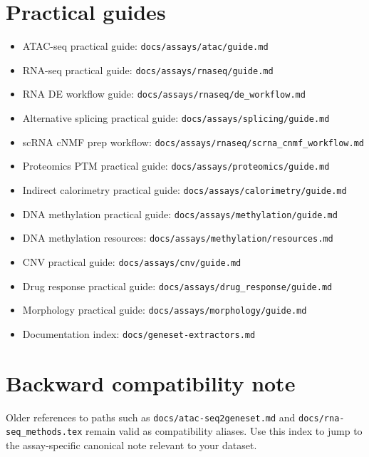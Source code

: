 \documentclass[11pt]{article}
\begin{document}
\section*{Practical guides}
\begin{itemize}[leftmargin=2em]
\item ATAC-seq practical guide: \texttt{docs/assays/atac/guide.md}
\item RNA-seq practical guide: \texttt{docs/assays/rnaseq/guide.md}
\item RNA DE workflow guide: \texttt{docs/assays/rnaseq/de\_workflow.md}
\item Alternative splicing practical guide: \texttt{docs/assays/splicing/guide.md}
\item scRNA cNMF prep workflow: \texttt{docs/assays/rnaseq/scrna\_cnmf\_workflow.md}
\item Proteomics PTM practical guide: \texttt{docs/assays/proteomics/guide.md}
\item Indirect calorimetry practical guide: \texttt{docs/assays/calorimetry/guide.md}
\item DNA methylation practical guide: \texttt{docs/assays/methylation/guide.md}
\item DNA methylation resources: \texttt{docs/assays/methylation/resources.md}
\item CNV practical guide: \texttt{docs/assays/cnv/guide.md}
\item Drug response practical guide: \texttt{docs/assays/drug\_response/guide.md}
\item Morphology practical guide: \texttt{docs/assays/morphology/guide.md}
\item Documentation index: \texttt{docs/geneset-extractors.md}
\end{itemize}

\section*{Backward compatibility note}
Older references to paths such as \texttt{docs/atac-seq2geneset.md} and
\texttt{docs/rna-seq\_methods.tex} remain valid as compatibility aliases.
Use this index to jump to the assay-specific canonical note relevant to your dataset.
\end{document}
